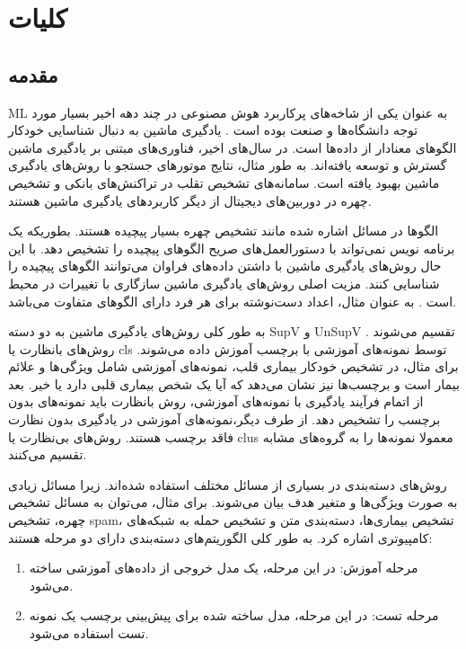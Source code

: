 \pagestyle{fancy}
\fancyhf{}
\cfoot{\thepage}
\fancyhead[R]{\rightmark}

\chapter{کلیات} \label{ch:1}
\section{مقدمه} \label{sec:1:1}
\gls*{ML} به عنوان یکی از شاخه‌های پرکاربرد هوش مصنوعی در چند دهه اخیر بسیار مورد توجه دانشگاه‌ها و صنعت بوده است \cite{jordan2015}. یادگیری ماشین به دنبال شناسایی خودکار الگوهای معنادار از داده‌ها است. در سال‌های اخیر، فناوری‌های مبتنی بر یادگیری ماشین گسترش و توسعه یافته‌اند. به طور مثال، نتایج موتورهای جستجو با روش‌های یادگیری ماشین بهبود یافته است. سامانه‌های تشخیص تقلب در تراکنش‌های بانکی و تشخیص چهره در دوربین‌های دیجیتال از دیگر کاربردهای یادگیری ماشین هستند.

الگوها در مسائل اشاره شده مانند تشخیص چهره بسیار پیچیده هستند. بطوریکه یک برنامه نویس نمی‌تواند با دستورالعمل‌های صریح الگوهای پیچیده را تشخیص دهد. با این حال روش‌های یادگیری ماشین با داشتن داده‌های فراوان می‌توانند الگوهای پیچیده را شناسایی کنند. مزیت اصلی روش‌های یادگیری ماشین سازگاری با تغییرات در محیط است \cite{shalev2014}. به عنوان مثال، اعداد دست‌نوشته برای هر فرد دارای الگوهای متفاوت می‌باشد.

به طور کلی روش‌های یادگیری ماشین به دو دسته \gls{SupV} و \gls{UnSupV} تقسیم می‌شوند \cite{shalev2014}. روش‌های بانظارت یا \gls{cls} توسط نمونه‌های آموزشی با برچسب آموزش داده می‌شوند. برای مثال، در تشخیص خودکار بیماری قلب، نمونه‌های آموزشی شامل ویژگی‌ها و علائم بیمار است و برچسب‌ها نیز نشان می‌دهد که آیا یک شخص بیماری قلبی دارد یا خیر. بعد از اتمام فرآیند یادگیری با نمونه‌های آموزشی، روش بانظارت باید نمونه‌های بدون برچسب را تشخیص دهد. از طرف دیگر،نمونه‌های آموزشی در یادگیری بدون نظارت فاقد برچسب هستند. روش‌های بی‌نظارت یا \gls{clus} معمولا نمونه‌ها را به گروه‌های مشابه تقسیم می‌کنند.

روش‌های دسته‌بندی در بسیاری از مسائل مختلف استفاده شده‌اند. زیرا مسائل زیادی به صورت ویژگی‌ها و متغیر هدف بیان می‌شوند. برای مثال، می‌توان به مسائل تشخیص چهره، تشخیص \gls{spam}، تشخیص بیماری‌ها، دسته‌بندی متن و تشخیص حمله به شبکه‌های کامپیوتری اشاره کرد.   به طور کلی الگوریتم‌های دسته‌بندی دارای دو مرحله هستند:
\begin{enumerate}
	\item مرحله آموزش: در این مرحله، یک مدل خروجی از داده‌های آموزشی ساخته می‌شود.
	\item مرحله تست: در این مرحله، مدل ساخته شده برای پیش‌بینی برچسب یک نمونه تست استفاده می‌شود.
\end{enumerate}

